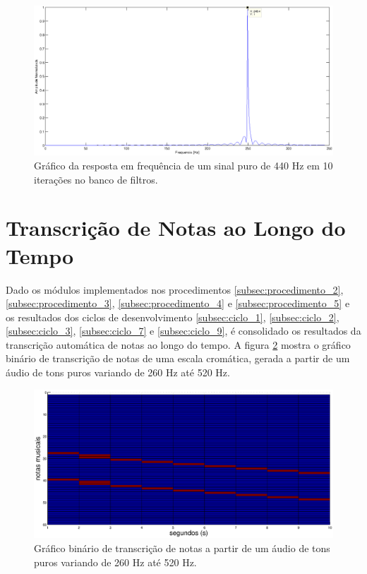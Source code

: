 \begin{figure}[h]
    \centering
    \includegraphics[keepaspectratio=true,scale=0.45]{figuras/wavelet_deslocado.eps}
  \caption{Gráfico da resposta em frequência de um sinal puro de 440 Hz em 10 iterações no banco de filtros.}
  \label{fig:440_wavelets_2}
\end{figure}

\section{Transcrição de Notas ao Longo do Tempo}
Dado os módulos implementados nos procedimentos \ref{subsec:procedimento_2}, \ref{subsec:procedimento_3}, \ref{subsec:procedimento_4} e \ref{subsec:procedimento_5} e os resultados dos ciclos de desenvolvimento \ref{subsec:ciclo_1}, \ref{subsec:ciclo_2}, \ref{subsec:ciclo_3}, \ref{subsec:ciclo_7} e \ref{subsec:ciclo_9}, é consolidado os resultados da transcrição automática de notas ao longo do tempo. A figura \ref{fig:notas_puras} mostra o gráfico binário de transcrição de notas de uma escala cromática, gerada a partir de um áudio de tons puros variando de 260 Hz até 520 Hz.

\begin{figure}[h]
    \centering
    \includegraphics[keepaspectratio=true,scale=0.4]{figuras/notas_puras.eps}
  \caption{Gráfico binário de transcrição de notas a partir de um áudio de tons puros variando de 260 Hz até 520 Hz.}
  \label{fig:notas_puras}
\end{figure}       

